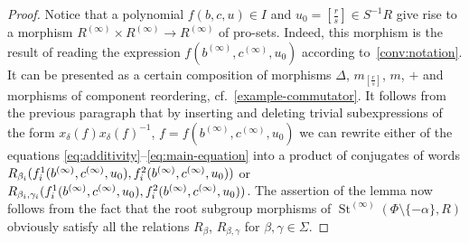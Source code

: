 \documentclass[oneside, 11pt]{amsart}
\numberwithin{equation}{section}
\theoremstyle{definition}
\theoremstyle{remark}
\DeclareMathOperator\St{St}
\begin{document}
\begin{proof}
 Notice that a polynomial $f(b,c,u)\in I$ and $u_0 = [\tfrac r s] \in S^{-1}R$ give rise to a morphism $R^{(\infty)}\times R^{(\infty)} \to R^{(\infty)}$ of pro-sets.
 Indeed, this morphism is the result of reading the expression $f(b^{(\infty)}, c^{(\infty)}, u_0)$ according to~\cref{conv:notation}. It can be presented as a certain composition of morphisms $\Delta$, $m_{[\tfrac r s]}$, $m$, $+$ and morphisms of component reordering, cf.~\cref{example-commutator}. It follows from the previous paragraph that by inserting and deleting trivial subexpressions of the form $x_{\delta}(f)x_{\delta}(f)^{-1}$, $f = f(b^{(\infty)}, c^{(\infty)}, u_0)$ we can rewrite either of the equations \eqref{eq:additivity}--\eqref{eq:main-equation} into a product of conjugates of words \(R_{\beta_i}(f_{i}^1(b^{(\infty)},c^{(\infty)},u_0),\- f_{i}^2(b^{(\infty)},c^{(\infty)},u_0))\) or $R_{\beta_i,\gamma_i}(f^{1}_i(b^{(\infty)}, c^{(\infty)},u_0),\- f^{2}_i(b^{(\infty)},c^{(\infty)},u_0))$.
 The assertion of the lemma now follows from the fact that the root subgroup morphisms of $\St^{(\infty)}(\Phi\setminus\{-\alpha\}, R)$ obviously satisfy all the relations $R_\beta$, $R_{\beta, \gamma}$ for $\beta,\gamma \in \Sigma$.
\end{proof}
\end{document}
